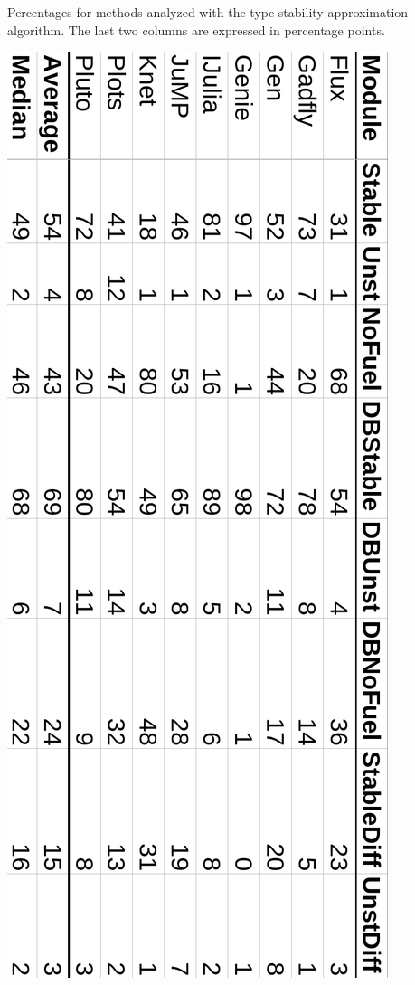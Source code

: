 \begin{table}%
\caption{Percentages for methods analyzed with the type stability
  approximation algorithm. The last two columns are expressed in percentage points.}%
  \includegraphics[width=.7\textwidth]
  {figs/sts-eval/table-eval-percent-numbers-rot.png}
\end{table}
